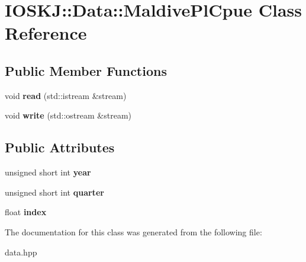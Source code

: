 \hypertarget{classIOSKJ_1_1Data_1_1MaldivePlCpue}{\section{I\-O\-S\-K\-J\-:\-:Data\-:\-:Maldive\-Pl\-Cpue Class Reference}
\label{classIOSKJ_1_1Data_1_1MaldivePlCpue}
}
\subsection*{Public Member Functions}
\begin{DoxyCompactItemize}
\item 
\hypertarget{classIOSKJ_1_1Data_1_1MaldivePlCpue_a70c9b6be419fdb294f308ea5daa86aa9}{void {\bfseries read} (std\-::istream \&stream)}\label{classIOSKJ_1_1Data_1_1MaldivePlCpue_a70c9b6be419fdb294f308ea5daa86aa9}

\item 
\hypertarget{classIOSKJ_1_1Data_1_1MaldivePlCpue_a5cc13990332eef94093c2b0d4c4ac150}{void {\bfseries write} (std\-::ostream \&stream)}\label{classIOSKJ_1_1Data_1_1MaldivePlCpue_a5cc13990332eef94093c2b0d4c4ac150}

\end{DoxyCompactItemize}
\subsection*{Public Attributes}
\begin{DoxyCompactItemize}
\item 
\hypertarget{classIOSKJ_1_1Data_1_1MaldivePlCpue_a74f457be89bb489478b9361f716e52ba}{unsigned short int {\bfseries year}}\label{classIOSKJ_1_1Data_1_1MaldivePlCpue_a74f457be89bb489478b9361f716e52ba}

\item 
\hypertarget{classIOSKJ_1_1Data_1_1MaldivePlCpue_a0a933e24599d452dd116855374876bc9}{unsigned short int {\bfseries quarter}}\label{classIOSKJ_1_1Data_1_1MaldivePlCpue_a0a933e24599d452dd116855374876bc9}

\item 
\hypertarget{classIOSKJ_1_1Data_1_1MaldivePlCpue_a217bc0b50e0910ead7e0db2cbb26dc30}{float {\bfseries index}}\label{classIOSKJ_1_1Data_1_1MaldivePlCpue_a217bc0b50e0910ead7e0db2cbb26dc30}

\end{DoxyCompactItemize}


The documentation for this class was generated from the following file\-:\begin{DoxyCompactItemize}
\item 
data.\-hpp\end{DoxyCompactItemize}
